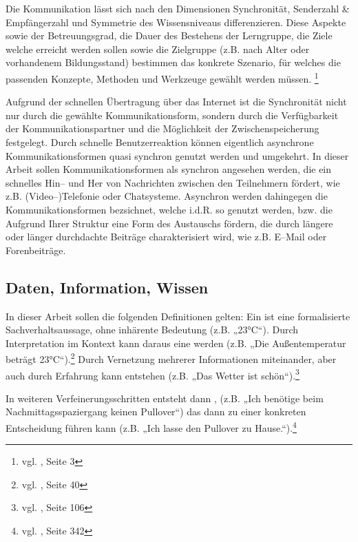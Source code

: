 Die Kommunikation lässt sich nach den Dimensionen Synchronität, Senderzahl \& Empfängerzahl und Symmetrie des Wissensniveaus differenzieren. Diese Aspekte sowie der Betreuungsgrad, die Dauer des Bestehens der Lerngruppe, die Ziele welche erreicht werden sollen sowie die Zielgruppe (z.B. nach Alter oder vorhandenem Bildungsstand) bestimmen das konkrete Szenario, für welches die passenden Konzepte, Methoden und Werkzeuge gewählt werden müssen. \footnote{vgl. \cite{csclcomp}, Seite 3}

Aufgrund der schnellen Übertragung über das Internet ist die Synchronität nicht nur durch die gewählte Kommunikationsform, sondern durch die Verfügbarkeit der Kommunikationspartner und die Möglichkeit der  Zwischenspeicherung festgelegt. Durch schnelle Benutzerreaktion können eigentlich asynchrone Kommunikationsformen quasi synchron genutzt werden und umgekehrt. In dieser Arbeit sollen Kommunikationsformen als synchron angesehen werden, die ein schnelles Hin-- und Her von Nachrichten zwischen den Teilnehmern fördert, wie z.B. (Video--)Telefonie oder Chatsysteme. Asynchron werden dahingegen die Kommunikationsformen bezsichnet, welche i.d.R. so genutzt werden, bzw. die Aufgrund Ihrer Struktur eine Form des Austauschs fördern, die durch längere oder länger durchdachte Beiträge charakterisiert wird, wie z.B. E--Mail oder Forenbeiträge.


\subsection{Daten, Information, Wissen}
\label{sub:defwissen}

In dieser Arbeit sollen die folgenden Definitionen gelten: Ein  ist eine formalisierte Sachverhaltsaussage, ohne inhärente Bedeutung (z.B. „23°C“). Durch Interpretation im Kontext kann daraus eine  werden (z.B. „Die Außentemperatur beträgt 23°C“).\footnote{vgl. \cite{kfk}, Seite 40} Durch Vernetzung mehrerer Informationen miteinander, aber auch durch Erfahrung kann  entstehen (z.B. „Das Wetter ist schön“).\footnote{vgl. \cite{pnik}, Seite 106}

In weiteren Verfeinerungsschritten entsteht dann , (z.B. „Ich benötige beim Nachmittagsspaziergang keinen Pullover“) das dann zu einer konkreten Entscheidung führen kann (z.B. „Ich lasse den Pullover zu Hause.“).\footnote{vgl. \cite{taylor}, Seite 342}

